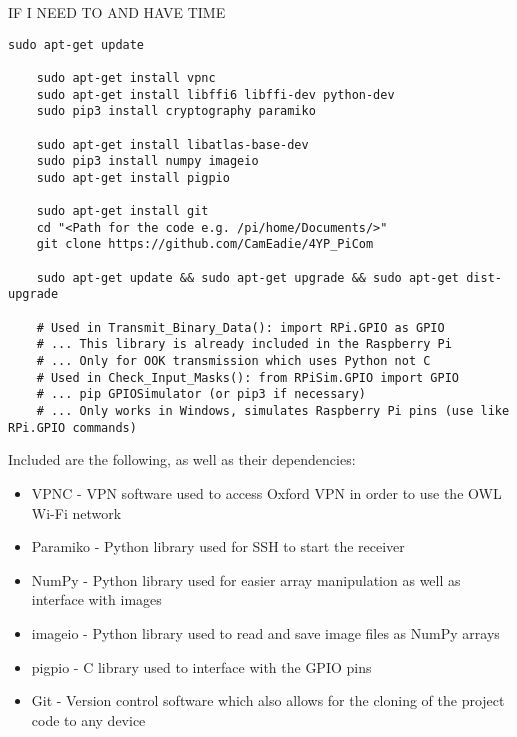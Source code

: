 \documentclass[../main.tex]{subfiles}
\begin{document}
 IF I NEED TO AND HAVE TIME
\lstset{style=python}
\begin{lstlisting}[caption=Libraries and Packages Required for the Test Bed]
	sudo apt-get update
	
	sudo apt-get install vpnc
	sudo apt-get install libffi6 libffi-dev python-dev
	sudo pip3 install cryptography paramiko
	
	sudo apt-get install libatlas-base-dev
	sudo pip3 install numpy imageio
	sudo apt-get install pigpio
	
	sudo apt-get install git
	cd "<Path for the code e.g. /pi/home/Documents/>"
	git clone https://github.com/CamEadie/4YP_PiCom

	sudo apt-get update && sudo apt-get upgrade && sudo apt-get dist-upgrade

	# Used in Transmit_Binary_Data(): import RPi.GPIO as GPIO
	# ... This library is already included in the Raspberry Pi
	# ... Only for OOK transmission which uses Python not C
	# Used in Check_Input_Masks(): from RPiSim.GPIO import GPIO
	# ... pip GPIOSimulator (or pip3 if necessary)
	# ... Only works in Windows, simulates Raspberry Pi pins (use like RPi.GPIO commands)
\end{lstlisting}

Included are the following, as well as their dependencies:

\begin{itemize}
	\item VPNC - VPN software used to access Oxford VPN in order to use the OWL Wi-Fi network \cite{lib_VPNC}
	\item Paramiko - Python library used for SSH to start the receiver \cite{lib_Paramiko}
	\item NumPy - Python library used for easier array manipulation as well as interface with images \cite{lib_NumPy}
	\item imageio - Python library used to read and save image files as NumPy arrays \cite{lib_imageio}
	\item pigpio - C library used to interface with the GPIO pins \cite{lib_pigpio}
	\item Git - Version control software which also allows for the cloning of the project code to any device \cite{lib_Git}
\end{itemize}

\clearpage

	
\end{document}
